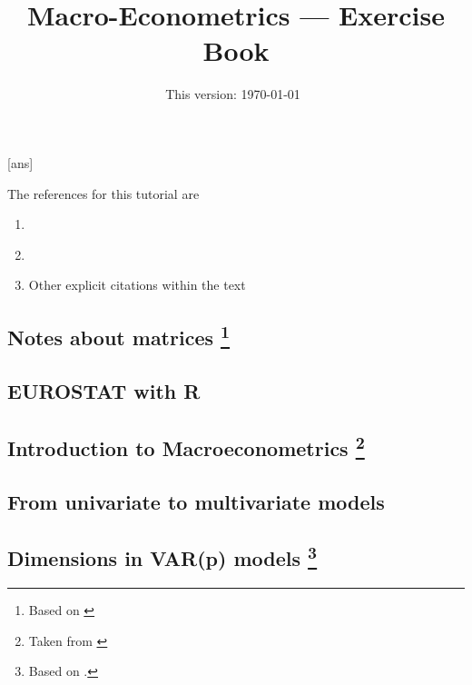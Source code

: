 \documentclass[11pt]{article}
\newcommand*{\varp}[1][p]{VAR(#1)}
\begin{document}
[ans]

\title{Macro-Econometrics --- Exercise Book}

\author{}

\date{This version: \today ~\currenttime}

\maketitle

The references for this tutorial are
\begin{enumerate}[label=\roman*.]
    \item \cite{MartinHurnHarris-2012}
    \item \cite{Mutschler-2018-github_repo}
    \item Other explicit citations within the text
\end{enumerate}

\subsection{Notes about matrices\texorpdfstring{%
        \protect\footnote{Based on \cite{MagnusNeudecker-2019-part1}}%
    }{}}


\subsection{EUROSTAT with R}


\subsection{Introduction to Macroeconometrics\texorpdfstring{%
        \protect\footnote{Taken from \cite[][see the section no 1, titled ``Macroeconometrics''.]{Mutschler-2018-github_repo}}%
    }{}}


\subsection{From univariate to multivariate models}


\subsection{Dimensions in \texorpdfstring{\varp{}}{VAR} models\texorpdfstring{%
        \protect\footnote{Based on \cite[][see the section 17, titled ``Dimensions and VAR(1) representation'']{Mutschler-2018-github_repo}.}%
    }{}
}

\end{document}
